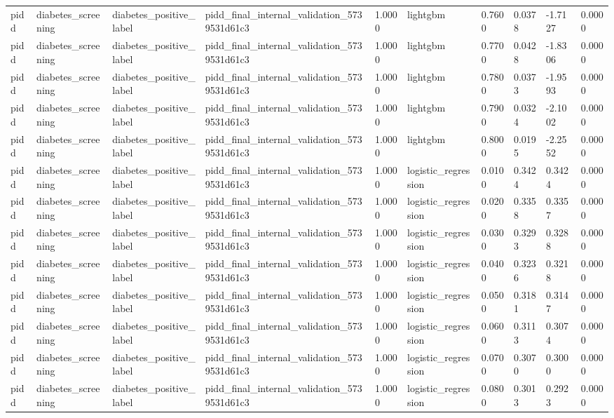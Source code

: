 \begin{tabular}{llllllllll}
pidd & diabetes\_screening & diabetes\_positive\_label & pidd\_final\_internal\_validation\_5739531d61c3 & 1.0000 & lightgbm & 0.7600 & 0.0378 & -1.7127 & 0.0000 \\
pidd & diabetes\_screening & diabetes\_positive\_label & pidd\_final\_internal\_validation\_5739531d61c3 & 1.0000 & lightgbm & 0.7700 & 0.0428 & -1.8306 & 0.0000 \\
pidd & diabetes\_screening & diabetes\_positive\_label & pidd\_final\_internal\_validation\_5739531d61c3 & 1.0000 & lightgbm & 0.7800 & 0.0373 & -1.9593 & 0.0000 \\
pidd & diabetes\_screening & diabetes\_positive\_label & pidd\_final\_internal\_validation\_5739531d61c3 & 1.0000 & lightgbm & 0.7900 & 0.0324 & -2.1002 & 0.0000 \\
pidd & diabetes\_screening & diabetes\_positive\_label & pidd\_final\_internal\_validation\_5739531d61c3 & 1.0000 & lightgbm & 0.8000 & 0.0195 & -2.2552 & 0.0000 \\
pidd & diabetes\_screening & diabetes\_positive\_label & pidd\_final\_internal\_validation\_5739531d61c3 & 1.0000 & logistic\_regression & 0.0100 & 0.3424 & 0.3424 & 0.0000 \\
pidd & diabetes\_screening & diabetes\_positive\_label & pidd\_final\_internal\_validation\_5739531d61c3 & 1.0000 & logistic\_regression & 0.0200 & 0.3358 & 0.3357 & 0.0000 \\
pidd & diabetes\_screening & diabetes\_positive\_label & pidd\_final\_internal\_validation\_5739531d61c3 & 1.0000 & logistic\_regression & 0.0300 & 0.3293 & 0.3288 & 0.0000 \\
pidd & diabetes\_screening & diabetes\_positive\_label & pidd\_final\_internal\_validation\_5739531d61c3 & 1.0000 & logistic\_regression & 0.0400 & 0.3236 & 0.3218 & 0.0000 \\
pidd & diabetes\_screening & diabetes\_positive\_label & pidd\_final\_internal\_validation\_5739531d61c3 & 1.0000 & logistic\_regression & 0.0500 & 0.3181 & 0.3147 & 0.0000 \\
pidd & diabetes\_screening & diabetes\_positive\_label & pidd\_final\_internal\_validation\_5739531d61c3 & 1.0000 & logistic\_regression & 0.0600 & 0.3113 & 0.3074 & 0.0000 \\
pidd & diabetes\_screening & diabetes\_positive\_label & pidd\_final\_internal\_validation\_5739531d61c3 & 1.0000 & logistic\_regression & 0.0700 & 0.3070 & 0.3000 & 0.0000 \\
pidd & diabetes\_screening & diabetes\_positive\_label & pidd\_final\_internal\_validation\_5739531d61c3 & 1.0000 & logistic\_regression & 0.0800 & 0.3013 & 0.2923 & 0.0000 \\

\end{tabular}
